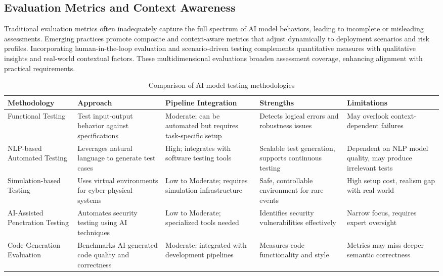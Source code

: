 \documentclass[sigconf]{acmart}
\begin{document}
\subsection{Evaluation Metrics and Context Awareness}

Traditional evaluation metrics often inadequately capture the full spectrum of AI model behaviors, leading to incomplete or misleading assessments. Emerging practices promote composite and context-aware metrics that adjust dynamically to deployment scenarios and risk profiles. Incorporating human-in-the-loop evaluation and scenario-driven testing complements quantitative measures with qualitative insights and real-world contextual factors. These multidimensional evaluations broaden assessment coverage, enhancing alignment with practical requirements.

\begin{table*}[htbp]
\centering
\caption{Comparison of AI model testing methodologies}
\label{tab:testing-methodologies}
\begin{adjustbox}{max width=\textwidth}
\begin{tabular}{@{}lllll@{}}
\toprule
Methodology & Approach & Pipeline Integration & Strengths & Limitations \\ \midrule
Functional Testing & Test input-output behavior against specifications & Moderate; can be automated but requires task-specific setup & Detects logical errors and robustness issues & May overlook context-dependent failures \\
NLP-based Automated Testing & Leverages natural language to generate test cases & High; integrates with software testing tools & Scalable test generation, supports continuous testing & Dependent on NLP model quality, may produce irrelevant tests \\
Simulation-based Testing & Uses virtual environments for cyber-physical systems & Low to Moderate; requires simulation infrastructure & Safe, controllable environment for rare events & High setup cost, realism gap with real world \\
AI-Assisted Penetration Testing & Automates security testing using AI techniques & Low to Moderate; specialized tools needed & Identifies security vulnerabilities effectively & Narrow focus, requires expert oversight \\
Code Generation Evaluation & Benchmarks AI-generated code quality and correctness & Moderate; integrated with development pipelines & Measures code functionality and style & Metrics may miss deeper semantic correctness \\ \bottomrule
\end{tabular}
\end{adjustbox}
\end{table*}
\end{document}
